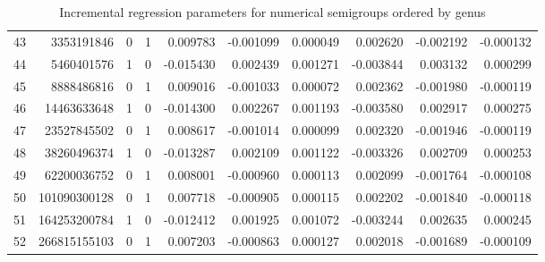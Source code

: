 \documentclass[12pt]{amsart}
\begin{document}
\begin{table}
{\begin{tabular}{|r|rrrrrrrrr|}
43 &3353191846 
&0&1
&0.009783	&-0.001099	&0.000049	
&0.002620	&-0.002192	&-0.000132
\\
44 &5460401576 
&1&0
&-0.015430	&0.002439	&0.001271	
&-0.003844	&0.003132	&0.000299
\\
45 &8888486816 
&0&1
&0.009016	&-0.001033	&0.000072	
&0.002362	&-0.001980	&-0.000119
\\
46 &14463633648 
&1&0
&-0.014300	&0.002267	&0.001193	
&-0.003580	&0.002917	&0.000275
\\
47 &23527845502 
&0&1
&0.008617	&-0.001014	&0.000099	
&0.002320	&-0.001946	&-0.000119
\\
48 &38260496374 
&1&0
&-0.013287	&0.002109	&0.001122	
&-0.003326	&0.002709	&0.000253
\\
49 &62200036752 
&0&1
&0.008001	&-0.000960	&0.000113	
&0.002099	&-0.001764	&-0.000108
\\
50 &101090300128 
&0&1
&0.007718	&-0.000905	&0.000115	
&0.002202	&-0.001840	&-0.000118
\\
51 &164253200784 
&1&0
&-0.012412	&0.001925	&0.001072	
&-0.003244	&0.002635	&0.000245
\\
52 &266815155103 
&0&1
&0.007203	&-0.000863	&0.000127	
&0.002018	&-0.001689	&-0.000109
\\\hline\end{tabular}}

  \caption{Incremental regression parameters for numerical semigroups ordered by genus}
  \label{tab:regressionincrements}
\end{table}
\end{document}

